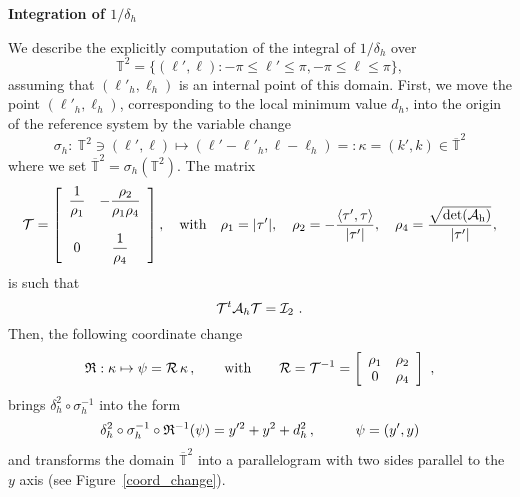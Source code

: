\documentclass[11pt]{report}
\def\calA{\mathcal{A}}
\def\2toro{\mathbb{T}^2}
\def\trasl2toro{\overline{\mathbb{T}}^2}
\begin{document}
\centerline{\bf\large Integration of $1/\delta_h$}
\vskip 0.5cm

We describe the explicitly computation of the integral of
$1/{\delta_h}$ over $$\2toro = \{(\ell',\ell): -\pi \leq \ell' \leq
\pi, -\pi \leq \ell\leq \pi\},$$ assuming that $(\ell'_h,\ell_h)$ is
an internal point of this domain.
%
First, we move the point $(\ell'_h,\ell_h)$, corresponding to the
local minimum value $d_h$, into the origin of the reference system by
the variable change
%
\begin{equation}
  \sigma_h: \ \2toro \ni (\ell',\ell) \mapsto 
  (\ell'-\ell'_h,\ell-\ell_h) =: \kappa = (k',k) \in \trasl2toro
  \label{eq:translation}
\end{equation}
%
where we set $\trasl2toro = \sigma_h\left(\2toro\right)$. The matrix
%
\begin{equation} 
  {\cal T} = \left[\begin{array}{cc} \displaystyle\frac{1}{\rho_1} &
      -\displaystyle\frac{\rho_2}{\rho_1\rho_4}\cr & \cr
      0 & \displaystyle\frac{1}{\rho_4} \end{array}\right], 
  \quad \rm{with}\quad
  \rho_1 = |\tau'|, \quad \rho_2  =
  -\frac{\langle\tau',\tau\rangle}{|\tau'|}, \quad \rho_4 = 
  \frac{\sqrt{\det(\calA_h)}}{|\tau'|},
\end{equation}
is such that
\begin{equation}
{\cal T}^t{\calA_h}{\cal T} = {\cal I}_2\ .
\end{equation}
Then, the following coordinate change
\begin{equation}
\mathfrak{R}: \kappa \mapsto \psi = {\cal R} \,\kappa\,,\qquad\mbox{with}\qquad
{\cal R} = {\cal T}^{-1} = \left[\begin{array}{cc} 
\rho_1 & \rho_2 \cr 0 & \rho_4 \cr \end{array}\right]\ ,
\label{eq:invlinelim}
\end{equation}
brings $\delta_h^2\circ\sigma_h^{-1}$ into the form
\begin{equation}
  \delta_h^2\circ\sigma_h^{-1}\circ\mathfrak{R}^{-1}(\psi) = y'^2 + y^2 + d_h^2\,,
  \hskip 1cm \psi=(y',y)
\label{eq:delta_h}
\end{equation}
and transforms the domain $\trasl2toro$ into a parallelogram with two
sides parallel to the $y$ axis (see Figure~\ref{coord_change}).
\end{document}
